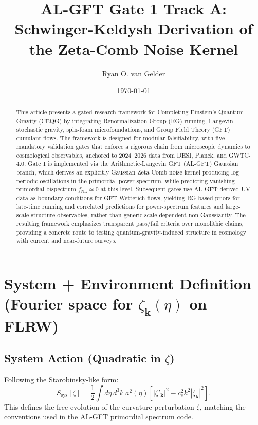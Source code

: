 \documentclass[12pt]{article}
\title{AL-GFT Gate 1 Track A: \\ Schwinger-Keldysh Derivation of the Zeta-Comb Noise Kernel}
\author{Ryan O. van Gelder}
\date{\today}
\begin{document}
\maketitle
\begin{abstract}
This article presents a gated research framework for Completing Einstein's Quantum Gravity (CEQG) by integrating Renormalization Group (RG) running, Langevin stochastic gravity, spin-foam microfoundations, and Group Field Theory (GFT) cumulant flows. The framework is designed for modular falsifiability, with five mandatory validation gates that enforce a rigorous chain from microscopic dynamics to cosmological observables, anchored to 2024–2026 data from DESI, Planck, and GWTC-4.0. Gate 1 is implemented via the Arithmetic-Langevin GFT (AL-GFT) Gaussian branch, which derives an explicitly Gaussian Zeta-Comb noise kernel producing log-periodic oscillations in the primordial power spectrum, while predicting vanishing primordial bispectrum \(f_{\mathrm{NL}} \simeq 0\) at this level. Subsequent gates use AL-GFT-derived UV data as boundary conditions for GFT Wetterich flows, yielding RG-based priors for late-time running and correlated predictions for power-spectrum features and large-scale-structure observables, rather than generic scale-dependent non-Gaussianity. The resulting framework emphasizes transparent pass/fail criteria over monolithic claims, providing a concrete route to testing quantum-gravity-induced structure in cosmology with current and near-future surveys.
\end{abstract}
\section{System + Environment Definition (Fourier space for $\zeta_{\bm{k}}(\eta)$ on FLRW)}

\subsection{System Action (Quadratic in $\zeta$)}
Following the Starobinsky-like form:
\begin{equation}
S_{\text{sys}}[\zeta] = \frac{1}{2}\int d\eta \, d^3k \; a^2(\eta)\left[|\zeta'_{\bm{k}}|^2 - c_s^2 k^2 |\zeta_{\bm{k}}|^2\right].
\label{eq:sys_action}
\end{equation}
This defines the free evolution of the curvature perturbation $\zeta$, matching the conventions used in the AL-GFT primordial spectrum code.
\end{document}

